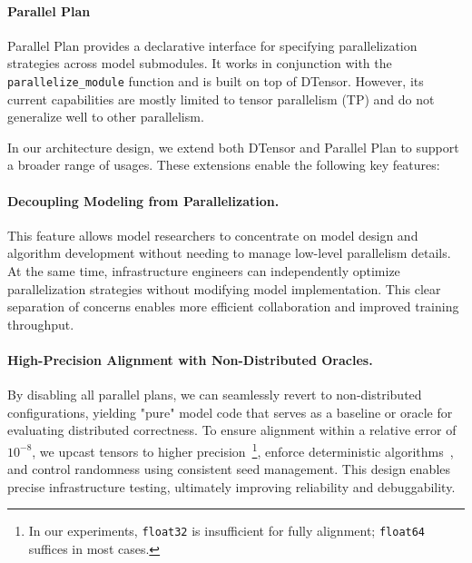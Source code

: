 \paragraph{Parallel Plan} 
Parallel Plan provides a declarative interface for specifying parallelization strategies across model submodules. It works in conjunction with the \texttt{parallelize\_module} function and is built on top of DTensor. However, its current capabilities are mostly limited to tensor parallelism (TP) and do not generalize well to other parallelism.

In our architecture design, we extend both DTensor and Parallel Plan to support a broader range of usages. These extensions enable the following key features:

\paragraph{Decoupling Modeling from Parallelization.} This feature allows model researchers to concentrate on model design and algorithm development without needing to manage low-level parallelism details. At the same time, infrastructure engineers can independently optimize parallelization strategies without modifying model implementation. This clear separation of concerns enables more efficient collaboration and improved training throughput.


\paragraph{High-Precision Alignment with Non-Distributed Oracles.} 
By disabling all parallel plans, we can seamlessly revert to non-distributed configurations, yielding "pure" model code that serves as a baseline or oracle for evaluating distributed correctness. To ensure alignment within a relative error of $10^{-8}$, we upcast tensors to higher precision~\footnote{In our experiments, \texttt{float32} is insufficient for fully alignment; \texttt{float64} suffices in most cases.}, enforce deterministic algorithms~\citep{pytorch2024reproducibility}, and control randomness using consistent seed management. This design enables precise infrastructure testing, ultimately improving reliability and debuggability.









